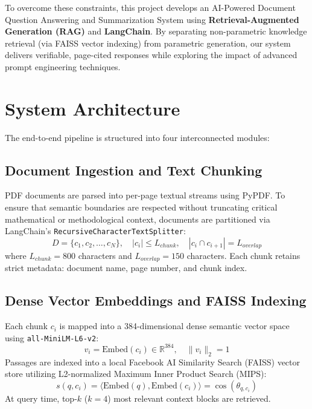 \documentclass[conference]{IEEEtran}
\begin{document}
To overcome these constraints, this project develops an AI-Powered Document Question Answering and Summarization System using \textbf{Retrieval-Augmented Generation (RAG)} and \textbf{LangChain}. By separating non-parametric knowledge retrieval (via FAISS vector indexing) from parametric generation, our system delivers verifiable, page-cited responses while exploring the impact of advanced prompt engineering techniques.

\section{System Architecture}
The end-to-end pipeline is structured into four interconnected modules:

\subsection{Document Ingestion and Text Chunking}
PDF documents are parsed into per-page textual streams using PyPDF. To ensure that semantic boundaries are respected without truncating critical mathematical or methodological context, documents are partitioned via LangChain's \texttt{RecursiveCharacterTextSplitter}:
\begin{equation}
    D = \{c_1, c_2, \dots, c_N\}, \quad |c_i| \le L_{chunk}, \quad |c_i \cap c_{i+1}| = L_{overlap}
\end{equation}
where $L_{chunk} = 800$ characters and $L_{overlap} = 150$ characters. Each chunk retains strict metadata: document name, page number, and chunk index.

\subsection{Dense Vector Embeddings and FAISS Indexing}
Each chunk $c_i$ is mapped into a 384-dimensional dense semantic vector space using \texttt{all-MiniLM-L6-v2}:
\begin{equation}
    v_i = \text{Embed}(c_i) \in \mathbb{R}^{384}, \quad \|v_i\|_2 = 1
\end{equation}
Passages are indexed into a local Facebook AI Similarity Search (FAISS) vector store utilizing L2-normalized Maximum Inner Product Search (MIPS):
\begin{equation}
    s(q, c_i) = \langle \text{Embed}(q), \text{Embed}(c_i) \rangle = \cos(\theta_{q, c_i})
\end{equation}
At query time, top-$k$ ($k=4$) most relevant context blocks are retrieved.
\end{document}
